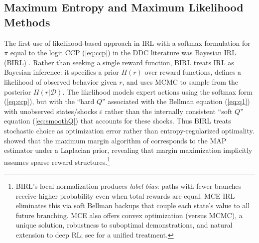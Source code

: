 \subsection{Maximum Entropy and Maximum Likelihood Methods}

The first use of likelihood-based approach in IRL with a softmax formulation for $\pi$ equal to the logit CCP (\ref{eq:ccp}) in the
DDC literature was Bayesian IRL (BIRL) \citep{birl:2007}. Rather than seeking a single reward function, BIRL treats IRL as Bayesian inference: it specifies a prior $\Pi(r)$ over reward functions, defines a likelihood of observed behavior given $r$, and uses MCMC to sample from the posterior $\Pi(r|\mathcal{D})$. The likelihood models expert actions using the softmax form (\ref{eq:ccp}), but with the ``hard $Q$'' associated
with the Bellman equation (\ref{eq:q1}) with unobserved states/shocks $\varepsilon$
rather than the internally consistent ``soft $Q$'' equation (\ref{eq:smoothQ}) that accounts for these shocks. 
Thus BIRL treats stochastic choice as optimization error rather than entropy-regularized optimality. \citet{birl:2007} showed that the maximum margin algorithm of \citet{ng:2000} corresponds to the MAP estimator under a Laplacian prior, revealing that margin maximization implicitly assumes sparse reward structures.\footnote{\footnotesize BIRL's local normalization produces {\it label bias\/}: paths with fewer branches receive higher probability even when total rewards are equal. MCE IRL eliminates this via soft Bellman backups that couple each state's value to all future branching. MCE also offers convex optimization (versus MCMC), a unique solution, robustness to suboptimal demonstrations, and natural extension to deep RL; see \citet{ni:2022} for a unified treatment.}

